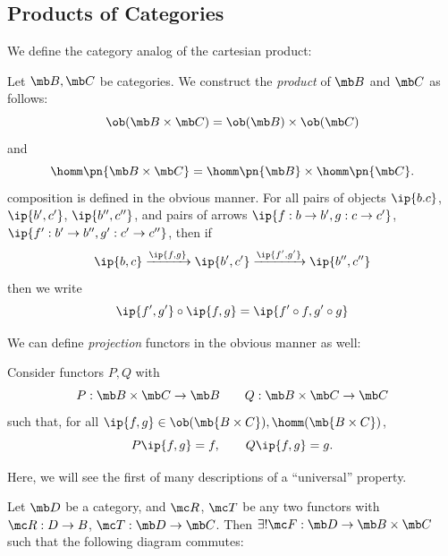 \documentclass{fkbook}
\theoremstyle{snazzydefinition}
\begin{document}
\begin{adjustwidth}{1em}{1em}
  \subsection{Products of Categories}
  We define the category analog of the cartesian product:
  \begin{definition}
    Let $\mb B, \mb C$ be categories. We construct the \emph{product}
    of $\mb B$ and $\mb C$ as follows:
    \[
      \ob(\mb B \times \mb C) = \ob(\mb B) \times \ob(\mb C)
    \]
    and
    \[
      \homm\pn{\mb B \times \mb C} = \homm\pn{\mb B} \times
      \homm\pn{\mb C}.
    \]
    composition is defined in the obvious manner. For all pairs of
    objects $\ip{b.c}$, $\ip{b', c'}$, $\ip{b'', c''}$, and pairs of
    arrows $\ip{f : b \to b',g : c \to c'}$, $\ip{f' : b' \to b'', g'
      : c' \to c''}$, then if
    \[
      \ip{b,c} \xrightarrow{\ip{f,g}} \ip{b',c'}
      \xrightarrow{\ip{f',g'}} \ip{b'', c''}
    \]
    then we write
    \[
      \ip{f',g'} \circ \ip{f,g} = \ip{f' \circ f, g' \circ g}
    \]
  \end{definition}
  We can define \emph{projection} functors in the obvious manner as
  well:
  \begin{definition}
    Consider functors $P,Q$ with
    \[
      P : \mb B \times \mb C \to \mb B \qquad Q : \mb B \times \mb C
      \to \mb C
    \]
    such that, for all $\ip{f,g} \in \ob(\mb{B \times C}), \homm(\mb{B
    \times C})$,
    \[
      P\ip{f,g} = f, \qquad Q\ip{f,g} = g.
    \]
  \end{definition}
  Here, we will see the first of many descriptions of a ``universal''
  property.
  \begin{theorem}
    Let $\mb D$ be a category, and $\mc R$, $\mc T$ be any two
    functors with $\mc R : D \to B$, $\mc T : \mb D \to \mb C$. Then
    $\exists! \mc F : \mb D \to \mb B \times \mb C$ such that the
    following diagram commutes:
    \begin{figure}[H]
      \centering
      \tikzset{node distance=2.5cm, auto}
\end{figure}
\end{theorem}
\end{adjustwidth}
\end{document}
